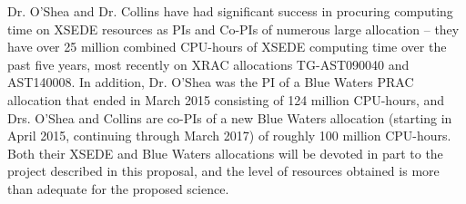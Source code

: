 Dr. O'Shea and Dr. Collins have had significant success in procuring
computing time on XSEDE resources as PIs and Co-PIs of numerous large
allocation -- they have over 25 million combined CPU-hours of XSEDE
computing time over the past five years, most recently on XRAC
allocations TG-AST090040 and AST140008.  In addition, Dr. O'Shea was
the PI of a Blue Waters PRAC allocation that ended in March 2015
consisting of 124 million CPU-hours, and Drs. O'Shea and Collins are
co-PIs of a new Blue Waters allocation (starting in April 2015,
continuing through March 2017) of roughly 100 million CPU-hours.  Both
their XSEDE and Blue Waters allocations will be devoted in part to the
project described in this proposal, and the level of resources
obtained is more than adequate for the proposed science.


